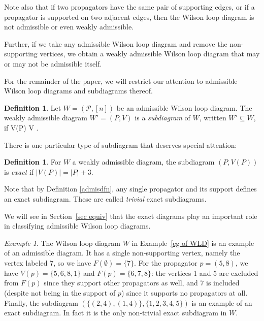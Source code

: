\documentclass[11pt]{article}
\def\bas #1\eas{\begin{align*} #1 \end{align*}}
\newcommand{\cP}{\mathcal{P}}
\theoremstyle{remark}
\newtheorem{eg}[thm]{Example}
\theoremstyle{definition}
\newtheorem{dfn}[thm]{Definition}
\begin{document}
Note also that if two propagators have the same pair of supporting edges, or if a propagator is supported on two adjacent edges, then the Wilson loop diagram is not admissible or even weakly admissible.

Further, if we take any admissible Wilson loop diagram and remove the non-supporting vertices, we obtain a weakly admissible Wilson loop diagram that may or may not be admissible itself.

For the remainder of the paper, we will restrict our attention to admissible Wilson loop diagrams and subdiagrams thereof.

\begin{dfn} \label{subdiagramdfn}
Let $W = (\cP, [n])$ be an admissible Wilson loop diagram. The weakly admissible diagram $W' = (P,V)$ is a {\em subdiagram} of $W$, written $W' \subseteq W$, if \bas P \subseteq \cP {} \quad V(P) \subseteq V \subseteq [n]\;.\eas
\end{dfn}

There is one particular type of subdiagram that deserves special attention:

\begin{dfn}\label{def:exact diagram}
For $W$ a weakly admissible diagram, the subdiagram $(P, V(P))$ is {\em exact} if $|V(P)| = |P| + 3$.
\end{dfn}

Note that by Definition \ref{admisdfn}, any single propagator and its support defines an exact subdiagram. These are called \emph{trivial} exact subdiagrams.

We will see in Section~\ref{sec equiv} that the exact diagrams play an important role in classifying admissible Wilson loop diagrams.

\vspace{3pt}
\begin{eg}
The Wilson loop diagram $W$ in Example~\ref{eg of WLD} is an example of an admissible diagram. It has a single non-supporting vertex, namely the vertex labeled 7, so we have $F(\emptyset) = \{7\}$. For the propagator $p = (5, 8)$, we have $V(p) = \{5,6,8,1\}$ and $F(p) = \{6, 7,8\}$: the vertices 1 and 5 are excluded from $F(p)$ since they support other propagators as well, and 7 is included (despite not being in the support of $p$) since it supports no propagators at all. Finally, the subdiagram $(\{(2, 4), (1, 4)\}, \{1, 2, 3, 4, 5\})$ is an example of an exact subdiagram.  In fact it is the only non-trivial exact subdiagram in $W$.
\end{eg}
\end{document}
